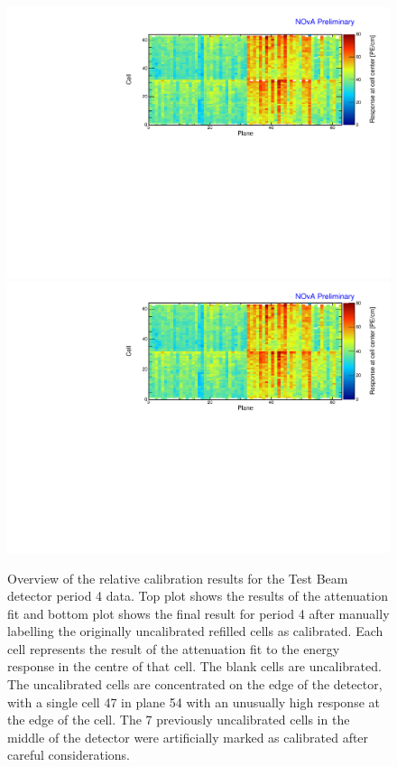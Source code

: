 \begin{figure}[!hbtp]
\centering
\includegraphics[width=\textwidth]{Plots/TBCalibration/CellResponseAtCentre_period4_original_Limited_NOvAPlotStyle.pdf}
\includegraphics[width=\textwidth]{Plots/TBCalibration/CellResponseAtCentre_period4_Limited_NOvAPlotStyle.pdf}
\caption[Map of fitted response at cell centre for period 4 data]{Overview of the relative calibration results for the Test Beam detector period 4 data. Top plot shows the results of the attenuation fit and bottom plot shows the final result for period 4 after manually labelling the originally uncalibrated refilled cells as calibrated. Each cell represents the result of the attenuation fit to the energy response in the centre of that cell. The blank cells are uncalibrated. The uncalibrated cells are concentrated on the edge of the detector, with a single cell 47 in plane 54 with an unusually high response at the edge of the cell. The 7 previously uncalibrated cells in the middle of the detector were artificially marked as calibrated after careful considerations.}
\label{fig:CellCentreResponsePeriod4}
\end{figure}

